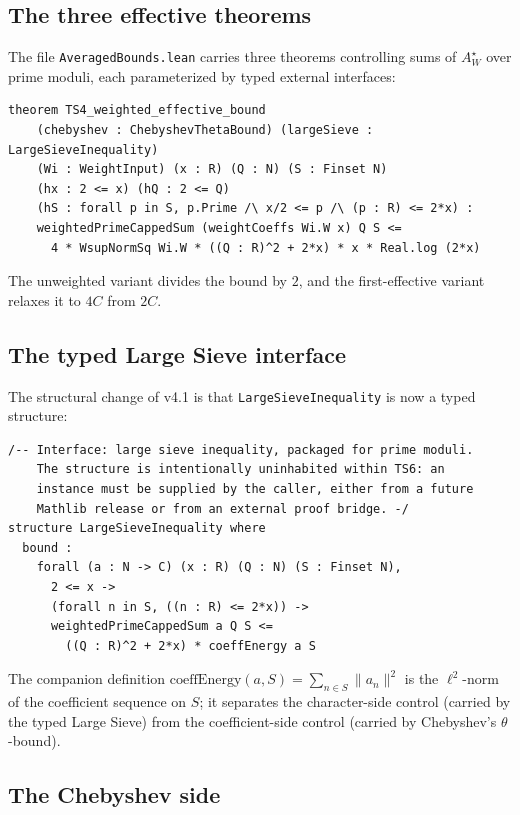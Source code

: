 \documentclass[11pt,a4paper]{article}
\theoremstyle{definition}
\newcommand{\AWs}{A_W^{\star}}
\begin{document}
\subsection{The three effective theorems}

The file \verb|AveragedBounds.lean| carries three theorems controlling sums of $\AWs$ over prime moduli, each parameterized by typed external interfaces:

\begin{lstlisting}
theorem TS4_weighted_effective_bound
    (chebyshev : ChebyshevThetaBound) (largeSieve : LargeSieveInequality)
    (Wi : WeightInput) (x : R) (Q : N) (S : Finset N)
    (hx : 2 <= x) (hQ : 2 <= Q)
    (hS : forall p in S, p.Prime /\ x/2 <= p /\ (p : R) <= 2*x) :
    weightedPrimeCappedSum (weightCoeffs Wi.W x) Q S <=
      4 * WsupNormSq Wi.W * ((Q : R)^2 + 2*x) * x * Real.log (2*x)
\end{lstlisting}

The unweighted variant divides the bound by $2$, and the first-effective variant relaxes it to $4C$ from $2C$.

\subsection{The typed Large Sieve interface}

The structural change of v4.1 is that \verb|LargeSieveInequality| is now a typed structure:

\begin{lstlisting}
/-- Interface: large sieve inequality, packaged for prime moduli.
    The structure is intentionally uninhabited within TS6: an
    instance must be supplied by the caller, either from a future
    Mathlib release or from an external proof bridge. -/
structure LargeSieveInequality where
  bound :
    forall (a : N -> C) (x : R) (Q : N) (S : Finset N),
      2 <= x ->
      (forall n in S, ((n : R) <= 2*x)) ->
      weightedPrimeCappedSum a Q S <=
        ((Q : R)^2 + 2*x) * coeffEnergy a S
\end{lstlisting}

The companion definition $\mathrm{coeffEnergy}(a, S) = \sum_{n \in S} \|a_n\|^2$ is the $\ell^2$-norm of the coefficient sequence on $S$; it separates the character-side control (carried by the typed Large Sieve) from the coefficient-side control (carried by Chebyshev's $\theta$-bound).

\subsection{The Chebyshev side}
\end{document}
